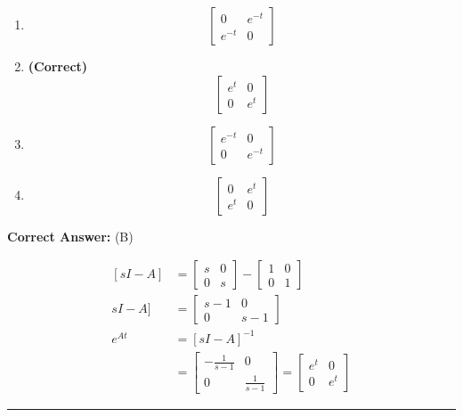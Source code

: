 \documentclass[11pt,a4paper]{article}
\begin{document}
\begin{enumerate}[label=(\Alph*)]
    \item \[
\begin{bmatrix} 0 &e^{-t} \\ e^{-t}&0 \end{bmatrix}
\]
    \item \textbf{(Correct)} \[
\begin{bmatrix} e^{t} &0 \\ 0 & e^{t} \end{bmatrix}
\]
    \item \[
\begin{bmatrix} e^{-t} &0 \\ 0 & e^{-t} \end{bmatrix}
\]
    \item \[
\begin{bmatrix} 0 &e^{t} \\ e^{t}&0 \end{bmatrix}
\]
\end{enumerate}

\noindent \textbf{Correct Answer:} (B)

\begin{tcolorbox}[solbox, title=Detailed Solution -- Question 177]
\[
\begin{aligned} [s I-A] &=\left[\begin{array}{ll}s & 0 \\0 & s\end{array}\right]-\left[\begin{array}{ll}1 & 0 \\0 & 1\end{array}\right] \\ s I-A] & =\left[\begin{array}{cc}s-1 & 0 \\0 & s-1\end{array}\right] \\ e^{A t} & =[s I-A]^{-1}\\ &=\left[\begin{array}{cc}-\frac{1}{s-1} & 0 \\ 0 & \frac{1}{s-1}\end{array}\right]=\left[\begin{array}{ll}e^{t} & 0 \\ 0 & e^{t}\end{array}\right] \end{aligned}
\]
\end{tcolorbox}

\vspace{1.5em}
\hrule
\vspace{1.5em}
\end{document}

